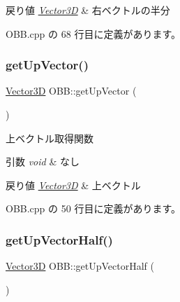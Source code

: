 \begin{DoxyRetVals}{戻り値}
{\em \mbox{\hyperlink{class_vector3_d}{Vector3D}}} & 右ベクトルの半分 \\
\hline
\end{DoxyRetVals}


 O\+B\+B.\+cpp の 68 行目に定義があります。

\mbox{\label{class_o_b_b_a73da06fa4dbebb2b59dc3168971c8d5d}} 
\subsubsection{\texorpdfstring{get\+Up\+Vector()}{getUpVector()}}
{\footnotesize\ttfamily \mbox{\hyperlink{class_vector3_d}{Vector3D}} O\+B\+B\+::get\+Up\+Vector (\begin{DoxyParamCaption}{ }\end{DoxyParamCaption})}



上ベクトル取得関数 


\begin{DoxyParams}{引数}
{\em void} & なし \\
\hline
\end{DoxyParams}

\begin{DoxyRetVals}{戻り値}
{\em \mbox{\hyperlink{class_vector3_d}{Vector3D}}} & 上ベクトル \\
\hline
\end{DoxyRetVals}


 O\+B\+B.\+cpp の 50 行目に定義があります。

\mbox{\label{class_o_b_b_a510542bc5071eb9bd174d69ffa64f023}} 
\subsubsection{\texorpdfstring{get\+Up\+Vector\+Half()}{getUpVectorHalf()}}
{\footnotesize\ttfamily \mbox{\hyperlink{class_vector3_d}{Vector3D}} O\+B\+B\+::get\+Up\+Vector\+Half (\begin{DoxyParamCaption}{ }\end{DoxyParamCaption})}



